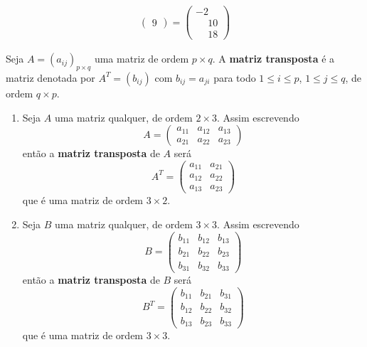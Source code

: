 \begin{observacao}
\begin{align*}
\begin{pmatrix}
        9\end{pmatrix} = \begin{pmatrix}-2\\\phantom{-}10\\\phantom{-}18\end{pmatrix}
    \end{align*}
\end{observacao}

\begin{definicao}
    Seja $A = (a_{ij})_{p\times q}$ uma matriz de ordem $p\times q$. A \textbf{matriz transposta} é a matriz
    denotada por $A^T = (b_{ij})$ com $b_{ij} = a_{ji}$ para todo $1 \le i \le p$, $1 \le j \le q$, de ordem $q \times p$.
\end{definicao}

\begin{exemplos}
    \begin{enumerate}
        \item Seja $A$ uma matriz qualquer, de ordem $2 \times 3$.
            Assim escrevendo
            \[
                A = \begin{pmatrix}
                        a_{11} & a_{12} & a_{13}\\
                        a_{21} & a_{22} & a_{23}
                    \end{pmatrix}
            \]
            então a \textbf{matriz transposta} de $A$ será
            \[
                A^T = \begin{pmatrix}
                        a_{11} & a_{21}\\
                        a_{12} & a_{22}\\
                        a_{13} & a_{23}
                    \end{pmatrix}
            \]
            que é uma matriz de ordem $3 \times 2$.

        \item Seja $B$ uma matriz qualquer, de ordem $3 \times 3$.
            Assim escrevendo
            \[
                B = \begin{pmatrix}
                        b_{11} & b_{12} & b_{13}\\
                        b_{21} & b_{22} & b_{23}\\
                        b_{31} & b_{32} & b_{33}
                    \end{pmatrix}
            \]
            então a \textbf{matriz transposta} de $B$ será
            \[
                B^T = \begin{pmatrix}
                        b_{11} & b_{21} & b_{31}\\
                        b_{12} & b_{22} & b_{32}\\
                        b_{13} & b_{23} & b_{33}
                    \end{pmatrix}
            \]
            que é uma matriz de ordem $3 \times 3$.


\end{enumerate}
\end{exemplos}
